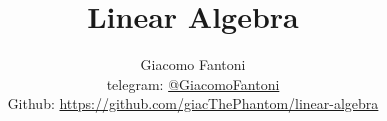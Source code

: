 

\title{\Huge\textbf{{Linear Algebra}}}

\author{
  Giacomo Fantoni \\
  \small telegram: \href{https://t.me/GiacomoFantoni}{@GiacomoFantoni} \\[3pt]
  \small Github: \href{https://github.com/giacThePhantom/linear-algebra}{https://github.com/giacThePhantom/linear-algebra}\\
}




  \maketitle
  \tableofcontents
  


